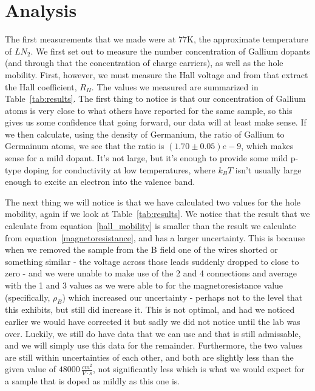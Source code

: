 \documentclass[reprint, nobibnotes, amssymb, amsmath, amsfonts, physics, mathtools, mathrsfs, floatfix]{revtex4-1}
\begin{document}
    \section{Analysis}
    The first measurements that we made were at 77K, the approximate temperature of $LN_2$.  We first set out to measure the number concentration of Gallium dopants (and through that the concentration of charge carriers), as well as the hole mobility.  First, however, we must measure the Hall voltage and from that extract the Hall coefficient, $R_H$.  The values we measured are summarized in Table~\ref{tab:results}.  The first thing to notice is that our concentration of Gallium atoms is very close to what others have reported for the same sample, so this gives us some confidence that going forward, our data will at least make sense.  If we then calculate, using the density of Germanium, the ratio of Gallium to Germainum atoms, we see that the ratio is $(1.70\pm0.05)e-9$, which makes sense for a mild dopant.  It's not large, but it's enough to provide some mild p-type doping for conductivity at low temperatures, where $k_B T$ isn't usually large enough to excite an electron into the valence band.

    The next thing we will notice is that we have calculated two values for the hole mobility, again if we look at Table~\ref{tab:results}.  We notice that the result that we calculate from equation~\ref{hall_mobility} is smaller than the result we calculate from equation~\ref{magnetoresistance}, and has a larger uncertainty.  This is because when we removed the sample from the B field one of the wires shorted or something similar - the voltage across those leads suddenly dropped to close to zero - and we were unable to make use of the 2 and 4 connections and average with the 1 and 3 values as we were able to for the magnetoresistance value (specifically, $\rho_B$) which increased our uncertainty - perhaps not to the level that this exhibits, but still did increase it.  This is not optimal, and had we noticed earlier we would have corrected it but sadly we did not notice until the lab was over.  Luckily, we still do have data that we can use and that is still admissable, and we will simply use this data for the remainder.  Furthermore, the two values are still within uncertainties of each other, and both are slightly less than the given value of $48000 \,  \frac{cm^2}{V\cdot s}$, not significantly less which is what we would expect for a sample that is doped as mildly as this one is.
\end{document}
